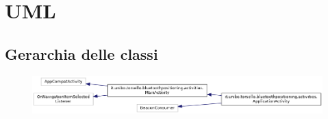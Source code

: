 \chapter{UML}

\section{Gerarchia delle classi}
\begin{figure}[ph]
	\centering
	\includegraphics[scale=.55]{img/uml/inherit_graph/inherit_graph_0.png}
	\caption[]{}
\end{figure}
%
%
%
%
%
%
%
%
%
%
%
